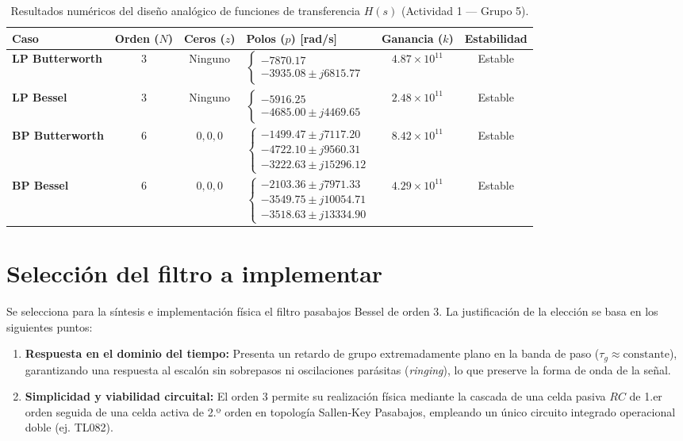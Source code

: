 \documentclass[12pt]{article}
\begin{document}
\begin{table}[h!]
\centering
\caption{Resultados numéricos del diseño analógico de funciones de transferencia $H(s)$ (Actividad 1 — Grupo 5).}
\label{tab:actividad1_polos_ceros}
\small
\begin{tabular}{|l|c|c|l|c|c|}
\hline
\textbf{Caso} & \textbf{Orden ($N$)} & \textbf{Ceros ($z$)} & \textbf{Polos ($p$) [rad/s]} & \textbf{Ganancia ($k$)} & \textbf{Estabilidad} \\
\hline
\textbf{LP Butterworth} & 3 & Ninguno & $\begin{cases} -7870.17 \\ -3935.08 \pm j 6815.77 \end{cases}$ & $4.87 \times 10^{11}$ & Estable \\
\hline
\textbf{LP Bessel} & 3 & Ninguno & $\begin{cases} -5916.25 \\ -4685.00 \pm j 4469.65 \end{cases}$ & $2.48 \times 10^{11}$ & Estable\\
\hline
\textbf{BP Butterworth} & 6 & $0, 0, 0$ & $\begin{cases} -1499.47 \pm j 7117.20 \\ -4722.10 \pm j 9560.31 \\ -3222.63 \pm j 15296.12 \end{cases}$ & $8.42 \times 10^{11}$ & Estable \\
\hline
\textbf{BP Bessel} & 6 & $0, 0, 0$ & $\begin{cases} -2103.36 \pm j 7971.33 \\ -3549.75 \pm j 10054.71 \\ -3518.63 \pm j 13334.90 \end{cases}$ & $4.29 \times 10^{11}$ & Estable  \\
\hline
\end{tabular}
\end{table}

 \newpage

\section{Selección del filtro a implementar}
Se selecciona para la síntesis e implementación física el filtro pasabajos Bessel de orden 3. La justificación de la elección se basa en los siguientes puntos:
\begin{enumerate}
    \item \textbf{Respuesta en el dominio del tiempo:} Presenta un retardo de grupo extremadamente plano en la banda de paso ($\tau_g \approx \text{constante}$), garantizando una respuesta al escalón sin sobrepasos ni oscilaciones parásitas (\textit{ringing}), lo que preserve la forma de onda de la señal.
    \item \textbf{Simplicidad y viabilidad circuital:} El orden 3 permite su realización física mediante la cascada de una celda pasiva $RC$ de 1.er orden seguida de una celda activa de 2.º orden en topología Sallen-Key Pasabajos, empleando un único circuito integrado operacional doble (ej. TL082).
\end{enumerate}
\end{document}
